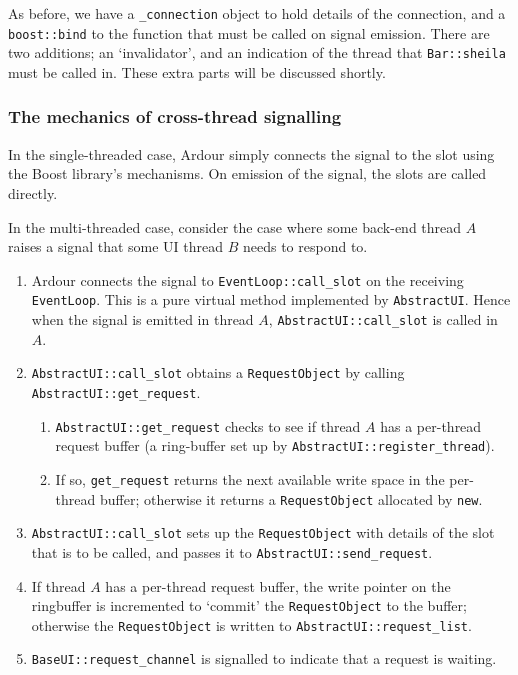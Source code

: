 \documentclass[10pt,a4paper]{book}
\newcommand{\code}[1]{\texttt{#1}}
\begin{document}
As before, we have a \code{\_connection} object to hold details of the connection, and
a \code{boost::bind} to the function that must be called on signal emission.  There
are two additions; an `invalidator', and an indication of the thread that \code{Bar::sheila}
must be called in.  These extra parts will be discussed shortly.

\subsubsection{The mechanics of cross-thread signalling}

In the single-threaded case, Ardour simply connects the signal to the slot using the Boost
library's mechanisms.  On emission of the signal, the slots are called directly.

In the multi-threaded case, consider the case where some back-end
thread $A$ raises a signal that some UI thread $B$ needs to respond to.

\begin{enumerate}
\item Ardour connects the signal to \code{EventLoop::call\_slot} on
  the receiving \code{EventLoop}.  This is a pure virtual method
  implemented by \code{AbstractUI}.  Hence when the signal is emitted
  in thread $A$, \code{AbstractUI::call\_slot} is called in $A$.
\item \code{AbstractUI::call\_slot} obtains a \code{RequestObject} by
  calling \code{AbstractUI::get\_request}.
\begin{enumerate}
\item \code{AbstractUI::get\_request} checks to see if thread $A$ has
  a per-thread request buffer (a ring-buffer set up by
  \code{AbstractUI::register\_thread}).
\item If so, \code{get\_request} returns the next available write
  space in the per-thread buffer; otherwise it returns a
  \code{RequestObject} allocated by \code{new}.
\end{enumerate}
\item \code{AbstractUI::call\_slot} sets up the \code{RequestObject}
  with details of the slot that is to be called, and passes it to
  \code{AbstractUI::send\_request}.
\item If thread $A$ has a per-thread request buffer, the write pointer
  on the ringbuffer is incremented to `commit' the
  \code{RequestObject} to the buffer; otherwise the
  \code{RequestObject} is written to \code{AbstractUI::request\_list}.
\item \code{BaseUI::request\_channel} is signalled to indicate that a
  request is waiting.
\end{enumerate}
\end{document}

